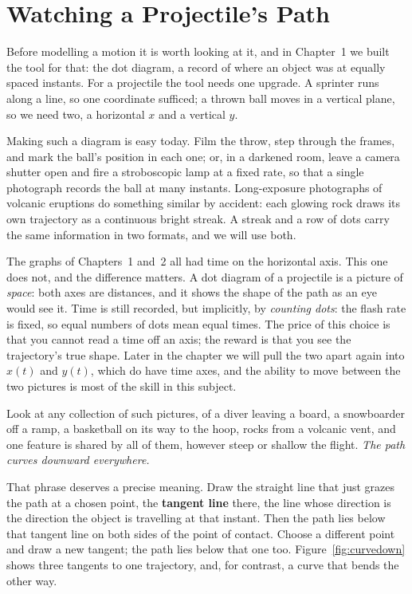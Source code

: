 \documentclass[11pt,twoside,openany]{book}
\begin{document}
\section{Watching a Projectile's Path}
\label{sec:watching}

Before modelling a motion it is worth looking at it, and in Chapter~1 we built the tool for that: the dot diagram, a record of where an object was at equally spaced instants. For a projectile the tool needs one upgrade. A sprinter runs along a line, so one coordinate sufficed; a thrown ball moves in a vertical plane, so we need two, a horizontal $x$ and a vertical $y$.

Making such a diagram is easy today. Film the throw, step through the frames, and mark the ball's position in each one; or, in a darkened room, leave a camera shutter open and fire a stroboscopic lamp at a fixed rate, so that a single photograph records the ball at many instants. Long-exposure photographs of volcanic eruptions do something similar by accident: each glowing rock draws its own trajectory as a continuous bright streak. A streak and a row of dots carry the same information in two formats, and we will use both.

\begin{modelnote}
The graphs of Chapters~1 and~2 all had time on the horizontal axis. This one does not, and the difference matters. A dot diagram of a projectile is a picture of \emph{space}: both axes are distances, and it shows the shape of the path as an eye would see it. Time is still recorded, but implicitly, by \emph{counting dots}: the flash rate is fixed, so equal numbers of dots mean equal times. The price of this choice is that you cannot read a time off an axis; the reward is that you see the trajectory's true shape. Later in the chapter we will pull the two apart again into $x(t)$ and $y(t)$, which do have time axes, and the ability to move between the two pictures is most of the skill in this subject.
\end{modelnote}

Look at any collection of such pictures, of a diver leaving a board, a snowboarder off a ramp, a basketball on its way to the hoop, rocks from a volcanic vent, and one feature is shared by all of them, however steep or shallow the flight. \emph{The path curves downward everywhere.}

That phrase deserves a precise meaning. Draw the straight line that just grazes the path at a chosen point, the \textbf{tangent line} there, the line whose direction is the direction the object is travelling at that instant. Then the path lies below that tangent line on both sides of the point of contact. Choose a different point and draw a new tangent; the path lies below that one too. Figure~\ref{fig:curvedown} shows three tangents to one trajectory, and, for contrast, a curve that bends the other way.
\end{document}
